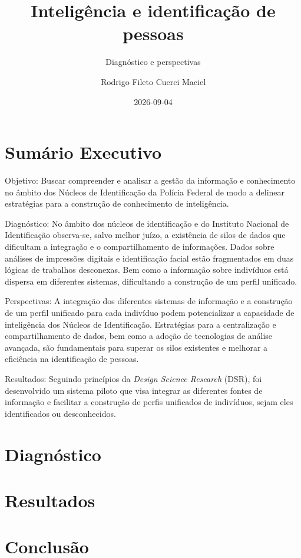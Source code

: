 \documentclass[
  brazilian,
  letterpaper,
  DIV=11,
  numbers=noendperiod]{scrartcl}
\title{Inteligência e identificação de pessoas}
\subtitle{Diagnóstico e perspectivas}
\author{Rodrigo Fileto Cuerci Maciel}
\date{2026-09-04}
\renewcommand*\contentsname{Índice}
\newcommand\contentsname{Índice}
\begin{document}
\maketitle

\renewcommand*\contentsname{Índice}
{
\setcounter{tocdepth}{3}
\tableofcontents
}

\section{Sumário Executivo}\label{sumuxe1rio-executivo}

Objetivo: Buscar compreender e analisar a gestão da informação e
conhecimento no âmbito dos Núcleos de Identificação da Polícia Federal
de modo a delinear estratégias para a construção de conhecimento de
inteligência.

Diagnóstico: No âmbito dos núcleos de identificação e do Instituto
Nacional de Identificação observa-se, salvo melhor juízo, a existência
de silos de dados que dificultam a integração e o compartilhamento de
informações. Dados sobre análises de impressões digitais e identificação
facial estão fragmentados em duas lógicas de trabalhos desconexas. Bem
como a informação sobre indivíduos está dispersa em diferentes sistemas,
dificultando a construção de um perfil unificado.

Perspectivas: A integração dos diferentes sistemas de informação e a
construção de um perfil unificado para cada indivíduo podem
potencializar a capacidade de inteligência dos Núcleos de Identificação.
Estratégias para a centralização e compartilhamento de dados, bem como a
adoção de tecnologias de análise avançada, são fundamentais para superar
os silos existentes e melhorar a eficiência na identificação de pessoas.

Resultados: Seguindo princípios da \emph{Design Science Research} (DSR),
foi desenvolvido um sistema piloto que visa integrar as diferentes
fontes de informação e facilitar a construção de perfis unificados de
indivíduos, sejam eles identificados ou desconhecidos.

\section{Diagnóstico}\label{diagnuxf3stico}

\section{Resultados}\label{resultados}

\section{Conclusão}\label{conclusuxe3o}
\end{document}
